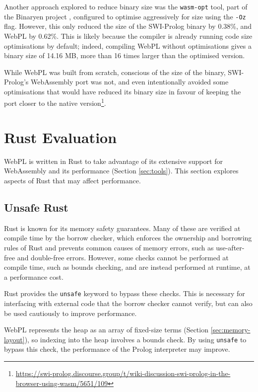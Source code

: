 \vspace*{-1.5em}

Another approach explored to reduce binary size was the \texttt{wasm-opt} tool, part of the Binaryen project \cite{zakaiBinaryenhttpsgithubcom2015}, configured to optimise aggressively for size using the \texttt{-Oz} flag. However, this only reduced the size of the SWI-Prolog binary by 0.38\%, and WebPL by 0.62\%. This is likely because the compiler is already running code size optimisations by default; indeed, compiling WebPL without optimisations gives a binary size of 14.16 MB, more than 16 times larger than the optimised version.

While WebPL was built from scratch, conscious of the size of the binary, SWI-Prolog's WebAssembly port was not, and even intentionally avoided some optimisations that would have reduced its binary size in favour of keeping the port closer to the native version\footnote{\url{https://swi-prolog.discourse.group/t/wiki-discussion-swi-prolog-in-the-browser-using-wasm/5651/109}}.

\section{Rust Evaluation}

\label{sec:rust-evaluation}

WebPL is written in Rust to take advantage of its extensive support for WebAssembly and its performance (Section \ref{sec:tools}). This section explores aspects of Rust that may affect performance.

\subsection{Unsafe Rust}

Rust is known for its memory safety guarantees. Many of these are verified at compile time by the borrow checker, which enforces the ownership and borrowing rules of Rust and prevents common causes of memory errors, such as use-after-free and double-free errors. However, some checks cannot be performed at compile time, such as bounds checking, and are instead performed at runtime, at a performance cost.

Rust provides the \texttt{unsafe} keyword to bypass these checks. This is necessary for interfacing with external code that the borrow checker cannot verify, but can also be used cautiously to improve performance.

WebPL represents the heap as an array of fixed-size terms (Section \ref{sec:memory-layout}), so indexing into the heap involves a bounds check. By using \texttt{unsafe} to bypass this check, the performance of the Prolog interpreter may improve.

